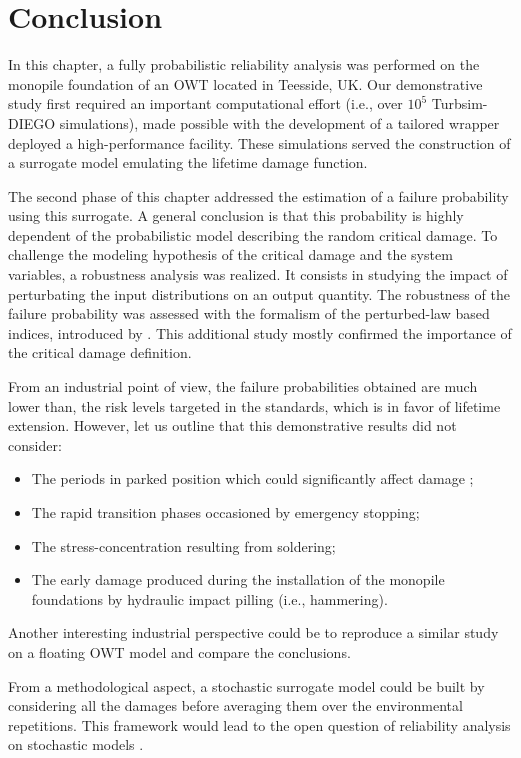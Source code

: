 \newpage
\section{Conclusion}

In this chapter, a fully probabilistic reliability analysis was performed on the monopile foundation of an OWT located in Teesside, UK. 
Our demonstrative study first required an important computational effort (i.e., over $10^5$ Turbsim-DIEGO simulations), made possible with the development of a tailored wrapper deployed a high-performance facility. 
These simulations served the construction of a surrogate model emulating the lifetime damage function. 

The second phase of this chapter addressed the estimation of a failure probability using this surrogate. 
A general conclusion is that this probability is highly dependent of the probabilistic model describing the random critical damage. 
To challenge the modeling hypothesis of the critical damage and the system variables, a robustness analysis was realized. 
It consists in studying the impact of perturbating the input distributions on an output quantity.   
The robustness of the failure probability was assessed with the formalism of the perturbed-law based indices, introduced by \citet{lemaitre_2015_PLI}.
This additional study mostly confirmed the importance of the critical damage definition. 

From an industrial point of view, the failure probabilities obtained are much lower than, the risk levels targeted in the standards, which is in favor of lifetime extension. 
However, let us outline that this demonstrative results did not consider: 
\begin{itemize}
    \item The periods in parked position which could significantly affect damage ;
    \item The rapid transition phases occasioned by emergency stopping;
    \item The stress-concentration resulting from soldering;
    \item The early damage produced during the installation of the monopile foundations by hydraulic impact pilling (i.e., hammering).  
\end{itemize} 
Another interesting industrial perspective could be to reproduce a similar study on a floating OWT model and compare the conclusions.  

From a methodological aspect, a stochastic surrogate model could be built by considering all the damages before averaging them over the environmental repetitions. 
This framework would lead to the open question of reliability analysis on stochastic models . 


